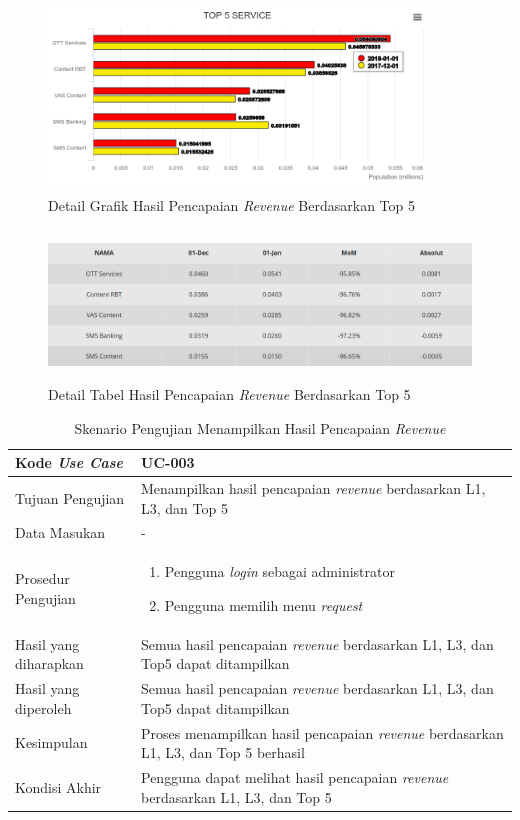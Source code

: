 \begin{figure}[h!]
	\centerline
	{\includegraphics[width=10cm,height=5cm]{bab6/detailGrafikHalamanT5.png}}
	\caption{Detail Grafik Hasil Pencapaian \textit{Revenue} Berdasarkan Top 5}
	\label{figure:detailGrafikRequestTop5}
\end{figure}

\begin{figure}[h!]
	\centerline
	{\includegraphics[width=12cm,height=4cm]{bab6/detailTabelHalamanT5.png}}
	\caption{Detail Tabel Hasil Pencapaian \textit{Revenue} Berdasarkan Top 5}
	\label{figure:detailTabelRequestTop5}
\end{figure}

\begin{table}[h!]
	\centering
	\begin{tabular}{|p{4cm}|p{6cm}|}
		\hline
		Kode \textit{Use Case} & UC-003\\ \hline
		Tujuan Pengujian & Menampilkan hasil pencapaian \textit{revenue} berdasarkan L1, L3, dan Top 5\\ \hline
		Data Masukan & - \\ \hline
		Prosedur Pengujian & 
		\begin{enumerate}
			\item Pengguna \textit{login} sebagai administrator
			\item Pengguna memilih menu \textit{request}
		\end{enumerate}\\ \hline
		Hasil yang diharapkan & Semua hasil pencapaian \textit{revenue} berdasarkan L1, L3, dan Top5 dapat ditampilkan \\ \hline
		Hasil yang diperoleh & Semua hasil pencapaian \textit{revenue} berdasarkan L1, L3, dan Top5 dapat ditampilkan \\ \hline
		Kesimpulan & Proses menampilkan hasil pencapaian \textit{revenue} berdasarkan L1, L3, dan Top 5 berhasil\\ \hline
		Kondisi Akhir & Pengguna dapat melihat hasil pencapaian \textit{revenue} berdasarkan L1, L3, dan Top 5\\ \hline
	\end{tabular}\caption{Skenario Pengujian Menampilkan Hasil Pencapaian \textit{Revenue}}
	\label{tab:list_request}
\end{table}


